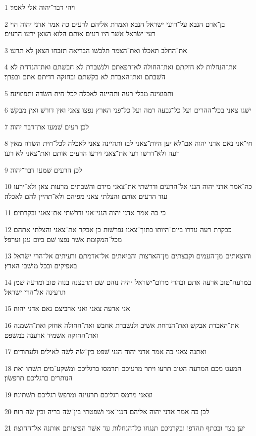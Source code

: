 \par 1 ויהי דבר־יהוה אלי לאמר׃
\par 2 בן־אדם הנבא על־רועי ישׂראל הנבא ואמרת אליהם לרעים כה אמר אדני יהוה הוי רעי־ישׂראל אשׁר היו רעים אותם הלוא הצאן ירעו הרעים׃
\par 3 את־החלב תאכלו ואת־הצמר תלבשׁו הבריאה תזבחו הצאן לא תרעו׃
\par 4 את־הנחלות לא חזקתם ואת־החולה לא־רפאתם ולנשׁברת לא חבשׁתם ואת־הנדחת לא השׁבתם ואת־האבדת לא בקשׁתם ובחזקה רדיתם אתם ובפרך׃
\par 5 ותפוצינה מבלי רעה ותהיינה לאכלה לכל־חית השׂדה ותפוצינה׃
\par 6 ישׁגו צאני בכל־ההרים ועל כל־גבעה רמה ועל כל־פני הארץ נפצו צאני ואין דורשׁ ואין מבקשׁ׃
\par 7 לכן רעים שׁמעו את־דבר יהוה׃
\par 8 חי־אני נאם אדני יהוה אם־לא יען היות־צאני לבז ותהיינה צאני לאכלה לכל־חית השׂדה מאין רעה ולא־דרשׁו רעי את־צאני וירעו הרעים אותם ואת־צאני לא רעו׃
\par 9 לכן הרעים שׁמעו דבר־יהוה׃
\par 10 כה־אמר אדני יהוה הנני אל־הרעים ודרשׁתי את־צאני מידם והשׁבתים מרעות צאן ולא־ירעו עוד הרעים אותם והצלתי צאני מפיהם ולא־תהיין להם לאכלה׃
\par 11 כי כה אמר אדני יהוה הנני־אני ודרשׁתי את־צאני ובקרתים׃
\par 12 כבקרת רעה עדרו ביום־היותו בתוך־צאנו נפרשׁות כן אבקר את־צאני והצלתי אתהם מכל־המקומת אשׁר נפצו שׁם ביום ענן וערפל׃
\par 13 והוצאתים מן־העמים וקבצתים מן־הארצות והביאתים אל־אדמתם ורעיתים אל־הרי ישׂראל באפיקים ובכל מושׁבי הארץ׃
\par 14 במרעה־טוב ארעה אתם ובהרי מרום־ישׂראל יהיה נוהם שׁם תרבצנה בנוה טוב ומרעה שׁמן תרעינה אל־הרי ישׂראל׃
\par 15 אני ארעה צאני ואני ארביצם נאם אדני יהוה׃
\par 16 את־האבדת אבקשׁ ואת־הנדחת אשׁיב ולנשׁברת אחבשׁ ואת־החולה אחזק ואת־השׁמנה ואת־החזקה אשׁמיד ארענה במשׁפט׃
\par 17 ואתנה צאני כה אמר אדני יהוה הנני שׁפט בין־שׂה לשׂה לאילים ולעתודים׃
\par 18 המעט מכם המרעה הטוב תרעו ויתר מרעיכם תרמסו ברגליכם ומשׁקע־מים תשׁתו ואת הנותרים ברגליכם תרפשׂון׃
\par 19 וצאני מרמס רגליכם תרעינה ומרפשׂ רגליכם תשׁתינה׃
\par 20 לכן כה אמר אדני יהוה אליהם הנני־אני ושׁפטתי בין־שׂה בריה ובין שׂה רזה׃
\par 21 יען בצד ובכתף תהדפו ובקרניכם תנגחו כל־הנחלות עד אשׁר הפיצותם אותנה אל־החוצה׃
